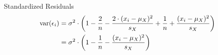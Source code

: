\begin{frame}{Standardized Residuals}
\begin{align*}
    \operatorname{var}(\epsilon_i) & = \sigma^2 \cdot \left(
        1 - \frac{2}{n} - \frac{2\cdot(x_i-\mu_X)^2}{s_X} +
    \frac{1}{n} + \frac{(x_i - \mu_X)^2}{s_X}\right)\\
    & = \sigma^2 \cdot \left(
    1 - \frac{1}{n} - \frac{(x_i-\mu_X)^2}{s_X}\right)
\end{align*}
\end{frame}
